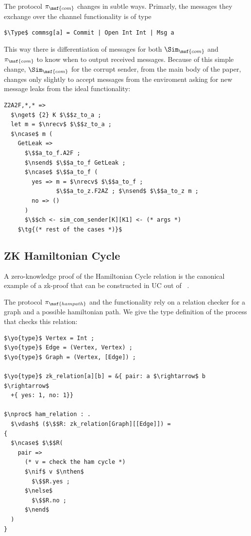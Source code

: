 The protocol $\pi_\msf{com}$ changes in subtle ways. Primarly, the messages they exchange over the channel functionality
is of type 
\begin{lstlisting}[basicstyle=\footnotesize\BeraMonottFamily, frame=single, mathescape]
$\Type$ commsg[a] = Commit | Open Int Int | Msg a 
\end{lstlisting}
This way there is differentiation of messages for both $\Sim_\msf{com}$ and $\pi_\msf{com}$ to know when to output received messages.
Because of this simple change, $\Sim_\msf{com}$ for the corrupt sender, from the main body of the paper, changes only slightly
to accept messages from the enviroment asking for new message leaks from the ideal functionality:
\begin{lstlisting}[basicstyle=\footnotesize\BeraMonottFamily, frame=single, mathescape]
Z2A2F,*,* =>
  $\nget$ {2} K $\$$z_to_a ;
  let m = $\nrecv$ $\$$z_to_a ;
  $\ncase$ m (
    GetLeak =>
      $\$$a_to_f.A2F ;
      $\nsend$ $\$$a_to_f GetLeak ;
      $\ncase$ $\$$a_to_f (
        yes => m = $\nrecv$ $\$$a_to_f ;
               $\$$a_to_z.F2AZ ; $\nsend$ $\$$a_to_z m ;
        no => ()
      )
      $\$$ch <- sim_com_sender[K][K1] <- (* args *) 
    $\tg{(* rest of the cases *)}$
\end{lstlisting}

\subsection{ZK Hamiltonian Cycle}
A zero-knowledge proof of the Hamiltonian Cycle relation is the canonical example of a zk-proof
that can be constructed in UC out of \Fcom~\cite{uccommitments}.

The protocol $\pi_\msf{hampath}$ and the functionality \Fzk rely on a relation checker for a graph
and a possible hamiltonian path. We give the type definition of the process that checks this relation:
\begin{lstlisting}[basicstyle=\footnotesize\BeraMonottFamily, frame=single, mathescape]
$\yo{type}$ Vertex = Int ;
$\yo{type}$ Edge = (Vertex, Vertex) ;
$\yo{type}$ Graph = (Vertex, [Edge]) ; 

$\yo{type}$ zk_relation[a][b] = &{ pair: a $\rightarrow$ b $\rightarrow$ 
  +{ yes: 1, no: 1}}

$\nproc$ ham_relation : . 
  $\vdash$ ($\$$R: zk_relation[Graph][[Edge]]) =
{
  $\ncase$ $\$$R(
    pair =>
      (* v = check the ham cycle *)
      $\nif$ v $\nthen$
        $\$$R.yes ;
      $\nelse$
        $\$$R.no ;
      $\nend$
  )
}
\end{lstlisting}

